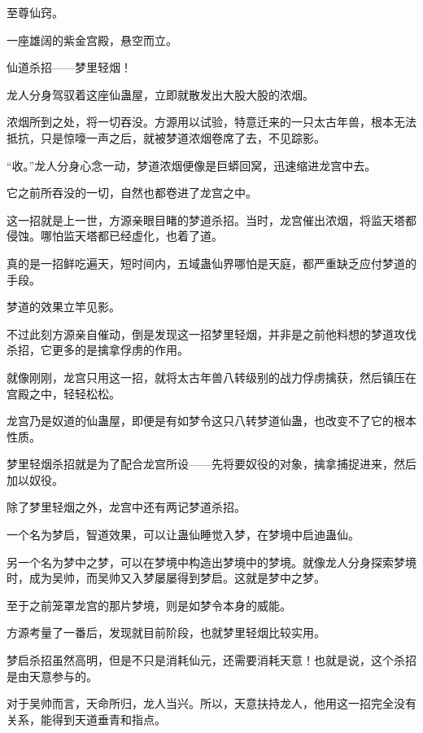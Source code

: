 
\begin{this_body}



至尊仙窍。

一座雄阔的紫金宫殿，悬空而立。

仙道杀招——梦里轻烟！

龙人分身驾驭着这座仙蛊屋，立即就散发出大股大股的浓烟。

浓烟所到之处，将一切吞没。方源用以试验，特意迁来的一只太古年兽，根本无法抵抗，只是惊嚎一声之后，就被梦道浓烟卷席了去，不见踪影。

“收。”龙人分身心念一动，梦道浓烟便像是巨蟒回窝，迅速缩进龙宫中去。

它之前所吞没的一切，自然也都卷进了龙宫之中。

这一招就是上一世，方源亲眼目睹的梦道杀招。当时，龙宫催出浓烟，将监天塔都侵蚀。哪怕监天塔都已经虚化，也着了道。

真的是一招鲜吃遍天，短时间内，五域蛊仙界哪怕是天庭，都严重缺乏应付梦道的手段。

梦道的效果立竿见影。

不过此刻方源亲自催动，倒是发现这一招梦里轻烟，并非是之前他料想的梦道攻伐杀招，它更多的是擒拿俘虏的作用。

就像刚刚，龙宫只用这一招，就将太古年兽八转级别的战力俘虏擒获，然后镇压在宫殿之中，轻轻松松。

龙宫乃是奴道的仙蛊屋，即便是有如梦令这只八转梦道仙蛊，也改变不了它的根本性质。

梦里轻烟杀招就是为了配合龙宫所设——先将要奴役的对象，擒拿捕捉进来，然后加以奴役。

除了梦里轻烟之外，龙宫中还有两记梦道杀招。

一个名为梦启，智道效果，可以让蛊仙睡觉入梦，在梦境中启迪蛊仙。

另一个名为梦中之梦，可以在梦境中构造出梦境中的梦境。就像龙人分身探索梦境时，成为吴帅，而吴帅又入梦屡屡得到梦启。这就是梦中之梦。

至于之前笼罩龙宫的那片梦境，则是如梦令本身的威能。

方源考量了一番后，发现就目前阶段，也就梦里轻烟比较实用。

梦启杀招虽然高明，但是不只是消耗仙元，还需要消耗天意！也就是说，这个杀招是由天意参与的。

对于吴帅而言，天命所归，龙人当兴。所以，天意扶持龙人，他用这一招完全没有关系，能得到天道垂青和指点。


\end{this_body}
